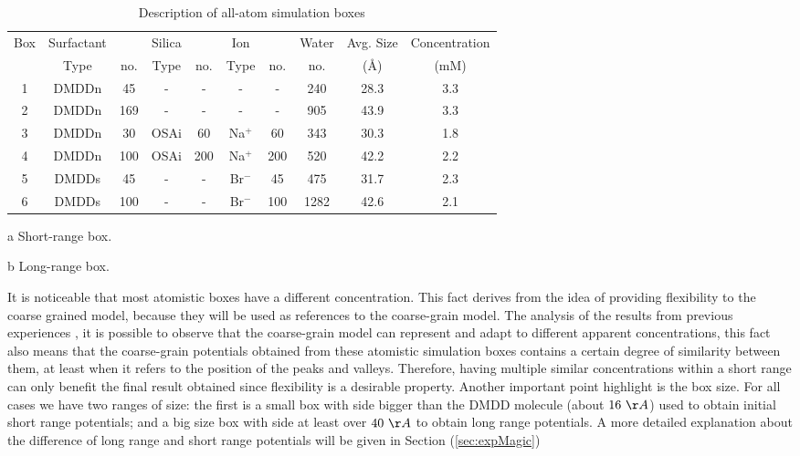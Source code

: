 \documentclass[10pt,a4paper,twoside]{article}
\begin{document}
 \begin{table}[ht!] 
  \centering
\begin{threeparttable}

  \caption{Description of all-atom simulation boxes}

    \begin{tabular}{c|cc|cc|cc|c|c|c}
    \toprule
    Box & Surfactant & & Silica & & Ion & & Water & Avg. Size & Concentration \\
	& Type & no. & Type & no. & Type & no. & no. & (\AA) & (mM) \\
    \midrule
    1\tnote{a}   & DMDDn  &  45  & - & -  & - & - & 240 & 28.3   & 3.3 \\
    2\tnote{b}   & DMDDn  & 169  & - & -  & - & - & 905 & 43.9  & 3.3 \\
    3\tnote{a}   & DMDDn  &  30  & OSAi & 60  & Na${}^+$ & 60 & 343 & 30.3 & 1.8\\
    4\tnote{b}   & DMDDn  & 100  & OSAi & 200  & Na${}^+$ & 200 & 520 & 42.2 & 2.2 \\
    5\tnote{a}   & DMDDs  &  45  & - & -  & Br${}^-$ & 45 & 475 & 31.7 & 2.3 \\
    6\tnote{b}   & DMDDs  & 100  & - & -  & Br${}^-$ & 100 & 1282 & 42.6 &  2.1\\
    \bottomrule
    \end{tabular}%
        \begin{tablenotes}
    	\item[a]Short-range box.
    	\item[b]Long-range box.
    \end{tablenotes}
  \label{tab:atombox}%
\end{threeparttable} 
\end{table}

It is noticeable that most atomistic boxes have a different concentration. This fact derives from the idea of providing flexibility to the coarse grained model, because they will be used as references to the coarse-grain model. The analysis of the results from previous experiences \cite{myproj}, it is possible to observe that the coarse-grain model can represent and adapt to different apparent concentrations, this fact also means that the coarse-grain potentials obtained from these atomistic simulation boxes contains a certain degree of similarity between them, at least when it refers to the position of the peaks and valleys. Therefore, having multiple similar concentrations within a short range can only benefit the final result obtained since flexibility is a desirable property. Another important point highlight is the box size. For all cases we have two ranges of size: the first is a small box with side bigger than the DMDD molecule (about $16 \ \AA$) used to obtain initial short range potentials; and a big size box with side at least over $40 \ \AA$ to obtain long range potentials. A more detailed explanation about the difference of long range and short range potentials will be given in Section (\ref{sec:expMagic})
\end{document}

